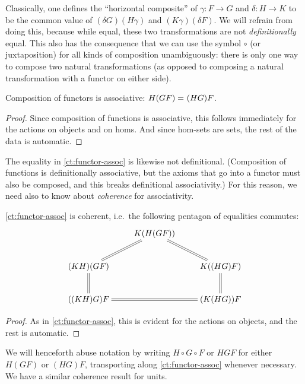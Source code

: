 %
%
Classically, one defines the ``horizontal composite'' of $\gamma:F\to G$ and $\delta:H\to K$ to be the common value of ${(\delta G)(H\gamma)}$ and ${(K\gamma)(\delta F)}$.
We will refrain from doing this, because while equal, these two transformations are not \emph{definitionally} equal.
This also has the consequence that we can use the symbol $\circ$ (or juxtaposition) for all kinds of composition unambiguously: there is only one way to compose two natural transformations (as opposed to composing a natural transformation with a functor on either side).

\begin{lem}\label{ct:functor-assoc}
  Composition of functors is associative: $H(GF) =_{} (HG)F$.
\end{lem}
\begin{proof}
  Since composition of functions is associative, this follows immediately for the actions on objects and on homs.
  And since hom-sets are sets, the rest of the data is automatic.
\end{proof}

The equality in \cref{ct:functor-assoc} is likewise not definitional.
(Composition of functions is definitionally associative, but the axioms that go into a functor must also be composed, and this breaks definitional associativity.)  For this reason, we need also to know about \emph{coherence} for associativity.

\begin{lem}\label{ct:pentagon}
  \cref{ct:functor-assoc} is coherent, i.e.\ the following pentagon of equalities commutes:
  \[ \xymatrix{ & K(H(GF)) \ar@{=}[dl] \ar@{=}[dr]\\
    (KH)(GF) \ar@{=}[d] && K((HG)F) \ar@{=}[d]\\
    ((KH)G)F && (K(HG))F \ar@{=}[ll].}
  \]
\end{lem}
\begin{proof}
  As in \cref{ct:functor-assoc}, this is evident for the actions on objects, and the rest is automatic.
\end{proof}

We will henceforth abuse notation by writing $H\circ G\circ F$ or $HGF$ for either $H(GF)$ or $(HG)F$, transporting along \cref{ct:functor-assoc} whenever necessary.
We have a similar coherence result for units.

